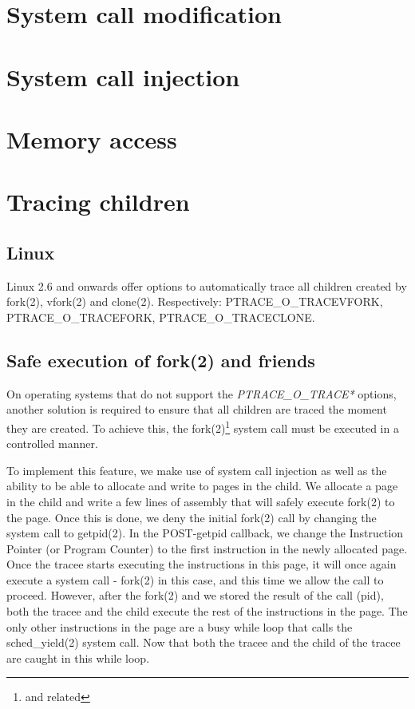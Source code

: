 \documentclass[a4paper, twoside, 10pt, twocolumn]{report}
\begin{document}

\section{System call modification}

\section{System call injection}

\section{Memory access}


\section{Tracing children}

\subsection{Linux}

Linux 2.6 and onwards offer options to automatically trace all children
created by fork(2), vfork(2) and clone(2). Respectively:
PTRACE\_O\_TRACEVFORK, PTRACE\_O\_TRACEFORK, PTRACE\_O\_TRACECLONE.



\subsection{Safe execution of fork(2) and friends}

On operating systems that do not support the \textit{PTRACE\_O\_TRACE*} options,
another solution is required to ensure that all children are traced the moment
they are created. To achieve this, the fork(2)\footnote{and related} system call
must be executed in a controlled manner.

To implement this feature, we make use of system call injection as well as the
ability to be able to allocate and write to pages in the child. We allocate a
page in the child and write a few lines of assembly that will safely execute
fork(2) to the page. Once this is done, we deny the initial fork(2) call by
changing the system call to getpid(2). In the POST-getpid callback, we change
the Instruction Pointer (or Program Counter) to the first instruction in the
newly allocated page. Once the tracee starts executing the instructions in this
page, it will once again execute a system call - fork(2) in this case, and this
time we allow the call to proceed. However, after the fork(2) and we stored the
result of the call (pid), both the tracee and the child execute the rest of the
instructions in the page. The only other instructions in the page are a busy
while loop that calls the sched\_yield(2) system call. Now that both the tracee
and the child of the tracee are caught in this while loop.
\end{document}
